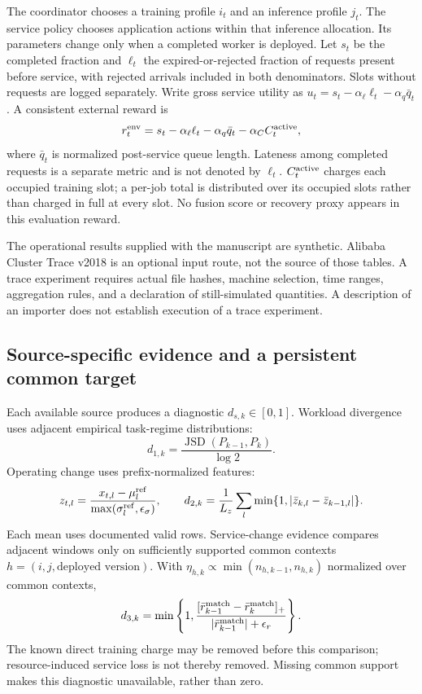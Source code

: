 \documentclass[10pt]{article}
\begin{document}
The coordinator chooses a training profile $i_t$ and an inference profile $j_t$.
The service policy chooses application actions within that inference allocation.
Its parameters change only when a completed worker is deployed. Let $s_t$ be
the completed fraction and $\ell_t$ the expired-or-rejected fraction of requests
present before service, with rejected arrivals included in both denominators.
Slots without requests are logged separately. Write gross service utility as
$u_t=s_t-\alpha_\ell\ell_t-\alpha_q\bar q_t$.
A consistent external reward is
\begin{equation}
 r_t^{\rm env}=s_t-\alpha_\ell\ell_t-\alpha_q\bar q_t
                  -\alpha_C C_t^{\rm active},
 \label{eq:external-reward}
\end{equation}
where $\bar q_t$ is normalized post-service queue length. Lateness among completed
requests is a separate metric and is not denoted by $\ell_t$.
$C_t^{\rm active}$ charges each occupied training slot; a per-job total is
distributed over its occupied slots rather than charged in full at every slot.
No fusion score or recovery proxy appears in this evaluation reward.

The operational results supplied with the manuscript are synthetic. Alibaba
Cluster Trace v2018 is an optional input route, not the source of those tables.
A trace experiment requires actual file hashes, machine selection, time ranges,
aggregation rules, and a declaration of still-simulated quantities. A description
of an importer does not establish execution of a trace experiment.

\subsection{Source-specific evidence and a persistent common target}
\label{sec:evidence}

Each available source produces a diagnostic $d_{s,k}\in[0,1]$.
Workload divergence uses adjacent empirical task-regime distributions:
\begin{equation}
 d_{1,k}=\frac{\operatorname{JSD}(P_{k-1},P_k)}{\log 2}.
\end{equation}
Operating change uses prefix-normalized features:
\begin{equation}
 z_{t,l}=\frac{x_{t,l}-\mu_l^{\rm ref}}
                  {\max(\sigma_l^{\rm ref},\epsilon_\sigma)},
 \qquad
 d_{2,k}=\frac1{L_z}\sum_l\min\{1,|\bar z_{k,l}-\bar z_{k-1,l}|\}.
\end{equation}
Each mean uses documented valid rows. Service-change evidence compares
adjacent windows only on sufficiently supported common contexts
$h=(i,j,\text{deployed version})$. With
$\eta_{h,k}\propto\min(n_{h,k-1},n_{h,k})$ normalized over common contexts,
\begin{equation}
 d_{3,k}=\min\left\{1,
 \frac{[\bar r_{k-1}^{\rm match}-\bar r_k^{\rm match}]_+}
      {|\bar r_{k-1}^{\rm match}|+\epsilon_r}\right\}.
\end{equation}
The known direct training charge may be removed before this comparison;
resource-induced service loss is not thereby removed. Missing common support
makes this diagnostic unavailable, rather than zero.
\end{document}
